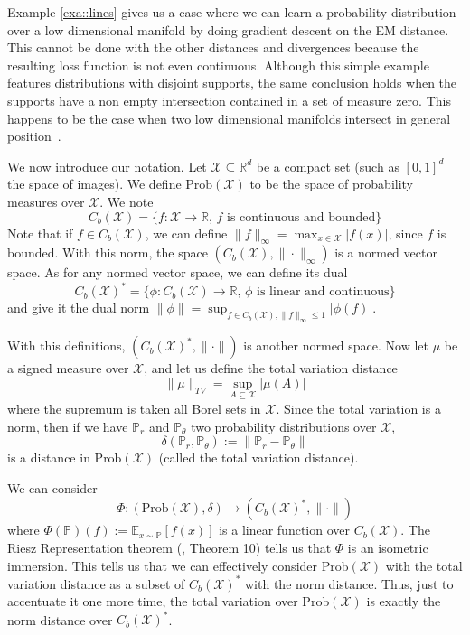 \documentclass{article} %
\newcommand\EE{\mathbb{E}}
\newcommand\PP{\mathbb{P}}
\newcommand\RR{\mathbb{R}}
\theoremstyle{definition}
\theoremstyle{definition}
\newcommand\manX{\mathcal{X}}
\begin{document}
Example \autoref{exa::lines} gives us a case where we can learn a
probability distribution over a low dimensional manifold by doing
gradient descent on the EM distance. This cannot be done with the
other distances and divergences because the resulting loss function is
not even continuous. Although this simple example features
distributions with disjoint supports, the same conclusion holds when
the supports have a non empty intersection contained in a set of
measure zero. This happens to be the case when two low dimensional
manifolds intersect in general position~\cite{Arj-ea-Princ}.


We now introduce our notation. Let $\mathcal{X} \subseteq{\RR^d}$
be a compact set (such as $[0,1]^d$ the space of images). We define
$\text{Prob}(\manX)$ to be the space of probability measures over
$\manX$. We note
$$C_b(\manX) = \{f: \manX \to \RR \text{, $f$ is continuous and bounded}\}$$
Note that if $f \in C_b(\manX)$,
we can define $\|f\|_\infty = \max_{x \in \manX} |f(x)|$, since
$f$ is bounded. With this norm, the space $(C_b(\manX), \|\cdot\|_\infty)$
is a normed vector space. As for any normed vector space, we can define
its dual
$$ C_b(\manX)^* = \{\phi: C_b(\manX) \rightarrow \RR \text{, $\phi$ is linear
and continuous} \} $$
and give it the dual norm $\|\phi\| = \sup_{f \in C_b(\manX), \|f\|_\infty \leq 1} |\phi(f)|$.

With this definitions, $(C_b(\manX)^*, \|\cdot\|)$ is another normed space.
Now let $\mu$ be a signed measure over $\manX$, and let us define
the total variation distance
$$\|\mu\|_{TV} = \sup_{A \subseteq \manX} |\mu(A)|$$
where the supremum is taken all Borel sets in $\manX$.
Since the total variation is a norm, then if we have $\PP_r$
and $\PP_\theta$ two probability distributions over $\manX$,
$$\delta(\PP_r, \PP_\theta) := \|\PP_r - \PP_\theta\|$$
is a distance in $\text{Prob}(\manX)$ (called the total variation
distance).

We can consider
$$ \Phi: (\text{Prob}(\manX), \delta) \rightarrow (C_b(\manX)^*, \|\cdot \|)$$
where $\Phi(\PP)(f) := \EE_{x \sim \PP}[f(x)]$ is a linear function
over $C_b(\manX)$. The Riesz Representation theorem (\cite{Kakutani-Riesz},
Theorem 10) tells us that $\Phi$ is an isometric immersion. This
tells us that we can effectively consider $\text{Prob}(\manX)$ with
the total variation distance as a subset of $C_b(\manX)^*$ with
the norm distance. Thus, just to accentuate it one more time,
the total variation over $\text{Prob}(\manX)$ is exactly
the norm distance over $C_b(\manX)^*$.
\end{document}
